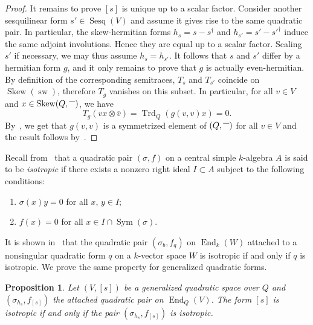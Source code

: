 \documentclass{amsart}
\newcommand{\invo}{\overline{\rule{2.5mm}{0mm}\rule{0mm}{4pt}}}
\newcommand{\op}{\dag}
\DeclareMathOperator{\Sesq}{Sesq}
\DeclareMathOperator{\sw}{sw}
\DeclareMathOperator{\End}{End}
\DeclareMathOperator{\Trd}{Trd}
\DeclareMathOperator{\Sym}{Sym}
\DeclareMathOperator{\Skew}{Skew}
\newtheorem{prop}{Proposition}[section]
\theoremstyle{remark}
\begin{document}
\begin{proof}
It remains to prove $[s]$ is unique up to a scalar factor. Consider
another sesquilinear form $s'\in \Sesq(V)$ and assume it gives rise to
the same quadratic pair. In particular, the skew-hermitian forms
$h_s=s-s^\op$ and $h_{s'}=s'-s'^\op$ induce the same adjoint
involutions. Hence they are equal up to a scalar factor. Scaling $s'$
if necessary, we may thus assume $h_s=h_{s'}$. It follows that $s$ and
$s'$ differ by a hermitian form $g$, and it only remains to prove that
$g$ is actually even-hermitian. By definition of the corresponding
semitraces, $T_s$ and $T_{s'}$ coincide on $\Skew(\sw)$, therefore
$T_g$ vanishes on this subset. In particular, for all $v\in V$ and
$x\in \Skew(Q,\invo)$, we have \[T_g(vx\otimes\overline
  v)=\Trd_Q(g(v,v)x)=0.\] By~\cite[(2.3)]{BoI}, we get that $g(v,v)$
is a symmetrized element of $(Q,\invo)$ for all $v\in V$ and the
result follows by~\cite[I(3.1.1)]{Knus}.  
\end{proof}

Recall from~\cite[(6.5)]{BoI} that a quadratic pair $(\sigma,f)$ on a
central simple $k$-algebra $A$ is said to be \emph{isotropic} if there
exists a nonzero right ideal $I\subset A$ subject to the following
conditions:
\begin{enumerate}
\item[(i)]
  $\sigma(x)y=0$ for all $x$, $y\in I$;
\item[(ii)]
  $f(x)=0$ for all $x\in I\cap\Sym(\sigma)$.
\end{enumerate}
It is shown in~\cite[(6.6)]{BoI} that the quadratic pair
$(\sigma_b,f_q)$ on $\End_k(W)$ attached to a nonsingular quadratic
form $q$ on a $k$-vector space $W$ is isotropic if and only if $q$ is
isotropic. We prove the same property for generalized quadratic
forms.

\begin{prop}
  \label{prop:isot}
  Let $(V,[s])$ be a generalized quadratic space over $Q$ and
  $(\sigma_{h_s},f_{[s]})$ the attached quadratic pair on
  $\End_Q(V)$. The form $[s]$ is isotropic if and only if the pair
  $(\sigma_{h_s}, f_{[s]})$ is isotropic.
\end{prop}
\end{document}

